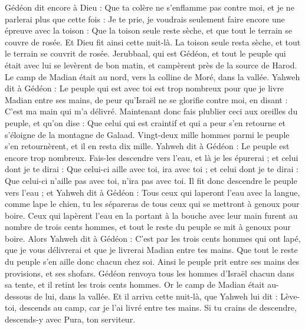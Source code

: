 \begin{multicols}{2}
Gédéon dit encore à Dieu : Que ta colère ne s'enflamme pas contre moi, et je ne parlerai plus que cette fois : Je te prie, je voudrais seulement faire encore une épreuve avec la toison : Que la toison seule reste sèche, et que tout le terrain se couvre de rosée.
Et Dieu fit ainsi cette nuit-là. La toison seule resta sèche, et tout le terrain se couvrit de rosée.
\VerseOne{}Jerubbaal, qui est Gédéon, et tout le peuple qui était avec lui se levèrent de bon matin, et campèrent près de la source de Harod. Le camp de Madian était au nord, vers la colline de Moré, dans la vallée.
Yahweh dit à Gédéon : Le peuple qui est avec toi est trop nombreux pour que je livre Madian entre ses mains, de peur qu'Israël ne se glorifie contre moi, en disant : C’est ma main qui m'a délivré.
Maintenant donc fais plublier ceci aux oreilles du peuple, et qu'on dise : Que celui qui est craintif et qui a peur s’en retourne et s’éloigne de la montagne de Galaad. Vingt-deux mille hommes parmi le peuple s'en retournèrent, et il en resta dix mille.
Yahweh dit à Gédéon : Le peuple est encore trop nombreux. Fais-les descendre vers l'eau, et là je les épurerai ; et celui dont je te dirai : Que celui-ci aille avec toi, ira avec toi ; et celui dont je te dirai : Que celui-ci n’aille pas avec toi, n’ira pas avec toi.
Il fit donc descendre le peuple vers l'eau ; et Yahweh dit à Gédéon : Tous ceux qui laperont l'eau avec la langue, comme lape le chien, tu les sépareras de tous ceux qui se mettront à genoux pour boire.
Ceux qui lapèrent l’eau en la portant à la bouche avec leur main furent au nombre de trois cents hommes, et tout le reste du peuple se mit à genoux pour boire.
Alors Yahweh dit à Gédéon : C’est par les trois cents hommes qui ont lapé, que je vous délivrerai et que je livrerai Madian entre tes mains. Que tout le reste du peuple s'en aille donc chacun chez soi.
Ainsi le peuple prit entre ses mains des provisions, et ses shofars. Gédéon renvoya tous les hommes d'Israël chacun dans sa tente, et il retint les trois cents hommes. Or le camp de Madian était au-dessous de lui, dans la vallée.
Et il arriva cette nuit-là, que Yahweh lui dit : Lève-toi, descends au camp, car je l'ai livré entre tes mains.
Si tu crains de descendre, descends-y avec Pura, ton serviteur.

\end{multicols}
